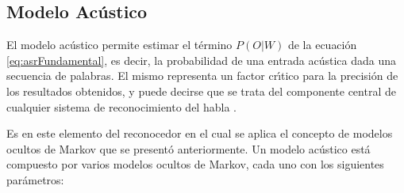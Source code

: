 \subsection{Modelo Ac\'ustico}
El modelo ac\'ustico permite estimar el t\'ermino $P(O|W)$ de la ecuaci\'on \ref{eq:asrFundamental}, es decir,
la probabilidad de una entrada ac\'ustica dada una secuencia de palabras.
El mismo representa un factor cr{\'\i}tico para la precisi\'on de los resultados obtenidos, y puede decirse que
se trata del componente central de cualquier sistema de reconocimiento del habla \cite{huang-handbook10}.

Es en este elemento del reconocedor en el cual se aplica el concepto de modelos ocultos de Markov que se present\'o
anteriormente. Un modelo ac\'ustico est\'a compuesto por varios modelos ocultos de Markov, cada uno con
los siguientes par\'ametros:


